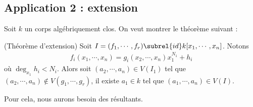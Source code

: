         \subsection{Application 2 : extension}
            Soit $k$ un corps algébriquement clos. On veut montrer le théorème suivant :
            \begin{theo} (Théorème d'extension)
                Soit $I = (f_1, \cdots, f_r) \subrel{id} k[x_1, \cdots, x_n]$. Notons
                \begin{align*}
                    f_i(x_1, \cdots, x_n) = g_i(x_2, \cdots, x_n)x_1^{N_1} + h_i
                \end{align*}
                où $\deg_{x_1} h_i < N_i$. Alors soit $(a_2, \cdots, a_n) \in V(I_1)$ tel que $(a_2, \cdots, a_n) \notin V(g_1, \cdots, g_r)$, il existe $a_1 \in k$ tel que $(a_1, \cdots, a_n) \in V(I)$.
            \end{theo}
            Pour cela, nous aurons besoin des résultants.

